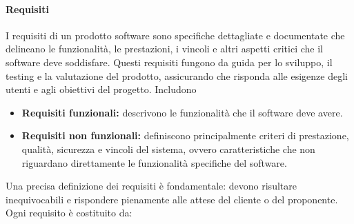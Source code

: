\paragraph{Requisiti}
I requisiti di un prodotto software sono specifiche dettagliate e documentate che delineano le funzionalità, le prestazioni, i vincoli e altri aspetti critici che il software deve soddisfare. Questi requisiti fungono da guida per lo sviluppo, il testing e la valutazione del prodotto, assicurando che risponda alle esigenze degli utenti e agli obiettivi del progetto.
Includono
\begin{itemize}
    \item \textbf{Requisiti funzionali:} descrivono le funzionalità che il software deve avere.
    \item \textbf{Requisiti non funzionali:} definiscono principalmente criteri di prestazione, qualità, sicurezza e vincoli del sistema, ovvero caratteristiche che non riguardano direttamente le funzionalità specifiche del software.
\end{itemize}
Una precisa definizione dei requisiti è fondamentale: devono risultare inequivocabili e rispondere pienamente alle attese del cliente o del proponente.\\
Ogni requisito è costituito da:
